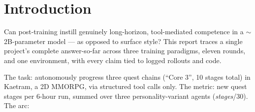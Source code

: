 \documentclass[11pt]{article}
\begin{document}
\begin{abstract}
teacher ($18$ vs $17$, with a recovery fix it lacked). We document a failure mode we believe
is novel: under teacher forcing the \textbf{teacher prefers the student's malformed tool syntax}
($\approx85\%$ probability on a continuation it never emits generatively) --- an in-context copy
prior surfacing inside the grader --- which dense reverse-KL distills. Suppressing the teacher's
endorsement of the defect in the grading context does not suppress the student's generation of it;
a small harness recovery affordance with in-context correction does ($98.5\%$ self-correction,
zero relapse). The program's ceiling is over-determined: Rick's Roll stays $0/4$ gated at link 1 by
a displaced fishing tool (cooking is never reached), behind which the cook-incompetent same-family
teacher transfers \emph{zero} cook behavior --- a teacher cannot grade in what it cannot do, one of
several blockers. Every arm is $n{=}1$ across three personality-variant agents;
we report the limits alongside the results.
\end{abstract}

\section{Introduction}

Can post-training instill genuinely long-horizon, tool-mediated competence in a $\sim$2B-parameter
model --- as opposed to surface style? This report traces a single project's complete answer-so-far
across three training paradigms, eleven rounds, and one environment, with every claim tied to
logged rollouts and code.

The task: autonomously progress three quest chains (``Core 3'', 10 stages total) in Kaetram, a 2D
MMORPG, via structured tool calls only. The metric: new quest stages per 6-hour run, summed over
three personality-variant agents (\emph{stages}/30). The arc:
\end{document}
